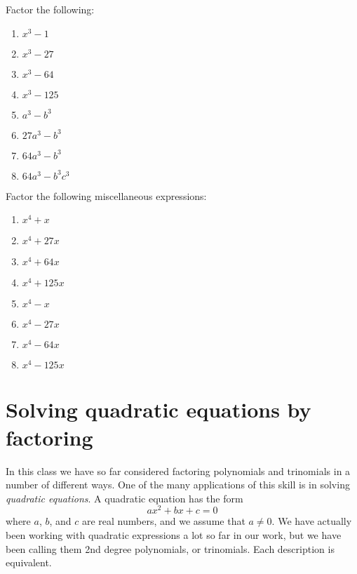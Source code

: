 \begin{myexample}
\drillandskill
Factor the following:
\begin{multicols}{2}
	\begin{enumerate}
		\item $x^3-1$       
		\item $x^3-27$      
		\item $x^3-64$      
		\item $x^3-125$     
		\item $a^3-b^3$     
		\item $27a^3-b^3$   
		\item $64a^3-b^3$   
		\item $64a^3-b^3c^3$
	\end{enumerate}
\end{multicols}

\end{myexample}

\begin{myexample}
\drillandskill
Factor the following miscellaneous expressions:
\end{myexample}
\begin{multicols}{2}
	\begin{enumerate}
		\item $x^4+x$    
		\item $x^4+27x$  
		\item $x^4+64x$  
		\item $x^4+125x$ 
		\item $x^4-x$    
		\item $x^4-27x$  
		\item $x^4-64x$  
		\item $x^4-125x$ 
	\end{enumerate}
\end{multicols}

\section{Solving quadratic equations by factoring}
%
In this class we have so far considered factoring polynomials and trinomials in a number of different
ways. One of the many applications of this skill is in solving {\em \gls{quadratic} equations}. A quadratic
\gls{equation} has the form
\[
	ax^2+bx+c=0
\]
where $a$, $b$, and $c$ are real numbers, and we assume that $a\ne 0$. We have actually been working
with quadratic expressions a lot so far in our work, but we have been calling them 2nd \gls{degree} polynomials, or
trinomials. Each description is equivalent.

